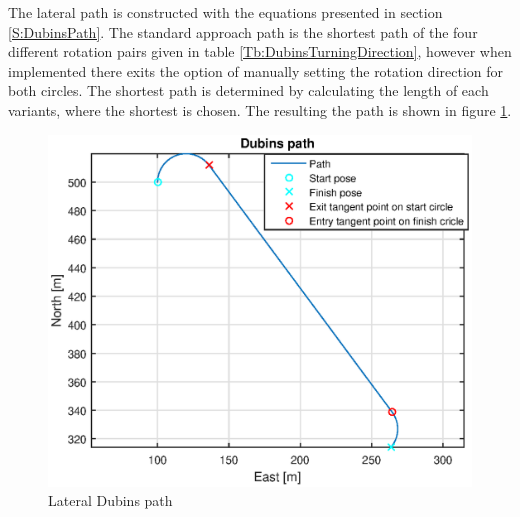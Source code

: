 The lateral path is constructed with the equations presented in section \ref{S:DubinsPath}. The standard approach path is the shortest path of the four different rotation pairs given in table \ref{Tb:DubinsTurningDirection}, however when implemented there exits the option of manually setting the rotation direction for both circles. The shortest path is determined by calculating the length of each variants, where the shortest is chosen. The resulting the path is shown in figure \ref{Fig:LateralPath}.
\begin{figure}[H]
	\centering
		\includegraphics[width=1\textwidth]{figs/SysPlot/DubinsPath.eps}
		\caption{Lateral Dubins path}
		\label{Fig:LateralPath}
\end{figure}

